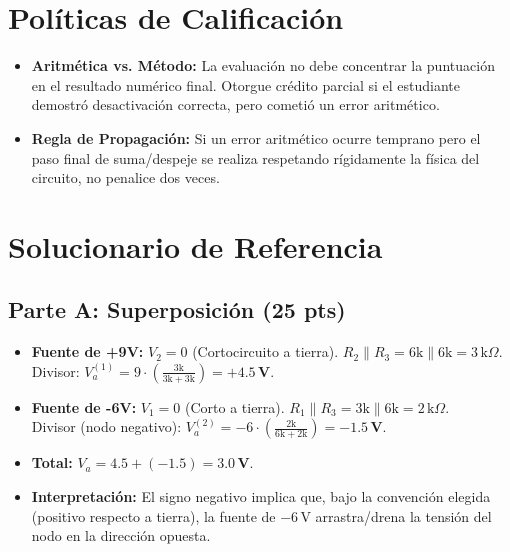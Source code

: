 \documentclass[11pt, a4paper]{article}
\begin{document}
\begin{tcolorbox}[colback=ucbblue!5!white, colframe=ucbblue, title=\textbf{Clave Docente y Guía de Calificación (Recuperatorio EC2)}]
\end{tcolorbox}

\section*{Políticas de Calificación}
\begin{itemize}
    \item \textbf{Aritmética vs. Método:} La evaluación no debe concentrar la puntuación en el resultado numérico final. Otorgue crédito parcial si el estudiante demostró desactivación correcta, pero cometió un error aritmético.
    \item \textbf{Regla de Propagación:} Si un error aritmético ocurre temprano pero el paso final de suma/despeje se realiza respetando rígidamente la física del circuito, no penalice dos veces.
\end{itemize}

\section*{Solucionario de Referencia}

\subsection*{Parte A: Superposición (25 pts)}
\begin{itemize}
    \item \textbf{Fuente de +9V:} $V_2 = 0$ (Cortocircuito a tierra). $R_2 \parallel R_3 = 6\text{k} \parallel 6\text{k} = 3\,\text{k}\Omega$. \\
    Divisor: $V_a^{(1)} = 9 \cdot \left(\frac{3\text{k}}{3\text{k} + 3\text{k}}\right) = \mathbf{+4.5\,\text{V}}$.
    \item \textbf{Fuente de -6V:} $V_1 = 0$ (Corto a tierra). $R_1 \parallel R_3 = 3\text{k} \parallel 6\text{k} = 2\,\text{k}\Omega$. \\
    Divisor (nodo negativo): $V_a^{(2)} = -6 \cdot \left(\frac{2\text{k}}{6\text{k} + 2\text{k}}\right) = \mathbf{-1.5\,\text{V}}$.
    \item \textbf{Total:} $V_a = 4.5 + (-1.5) = \mathbf{3.0\,\text{V}}$.
    \item \textbf{Interpretación:} El signo negativo implica que, bajo la convención elegida (positivo respecto a tierra), la fuente de $-6\,\text{V}$ arrastra/drena la tensión del nodo en la dirección opuesta.
\end{itemize}
\end{document}
